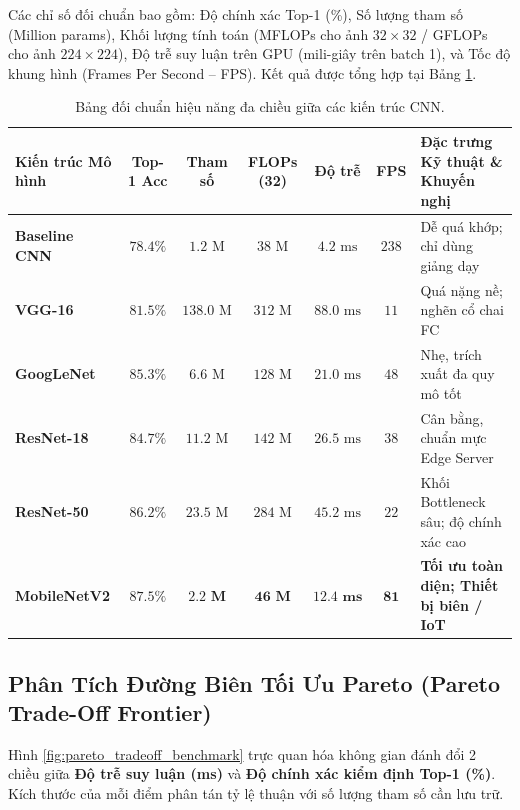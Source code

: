 \documentclass[12pt,a4paper]{report}
\begin{document}
Các chỉ số đối chuẩn bao gồm: Độ chính xác Top-1 (\%), Số lượng tham số (Million params), Khối lượng tính toán (MFLOPs cho ảnh $32\times 32$ / GFLOPs cho ảnh $224\times 224$), Độ trễ suy luận trên GPU (mili-giây trên batch 1), và Tốc độ khung hình (Frames Per Second -- FPS). Kết quả được tổng hợp tại Bảng \ref{tab:multi_model_benchmark}.

\begin{table}[H]
\centering
\caption{Bảng đối chuẩn hiệu năng đa chiều giữa các kiến trúc CNN.}
\label{tab:multi_model_benchmark}
\small
\begin{tabularx}{\textwidth}{lcccccX}
\toprule
\textbf{Kiến trúc Mô hình} & \textbf{Top-1 Acc} & \textbf{Tham số} & \textbf{FLOPs (32)} & \textbf{Độ trễ} & \textbf{FPS} & \textbf{Đặc trưng Kỹ thuật \& Khuyến nghị} \\
\midrule
\textbf{Baseline CNN}   & $78.4\%$ & $1.2\text{ M}$ & $38\text{ M}$ & $4.2\text{ ms}$ & $238$ & Dễ quá khớp; chỉ dùng giảng dạy \\
\textbf{VGG-16}         & $81.5\%$ & $138.0\text{ M}$ & $312\text{ M}$ & $88.0\text{ ms}$ & $11$ & Quá nặng nề; nghẽn cổ chai FC \\
\textbf{GoogLeNet}      & $85.3\%$ & $6.6\text{ M}$ & $128\text{ M}$ & $21.0\text{ ms}$ & $48$ & Nhẹ, trích xuất đa quy mô tốt \\
\textbf{ResNet-18}      & $84.7\%$ & $11.2\text{ M}$ & $142\text{ M}$ & $26.5\text{ ms}$ & $38$ & Cân bằng, chuẩn mực Edge Server \\
\textbf{ResNet-50}      & $86.2\%$ & $23.5\text{ M}$ & $284\text{ M}$ & $45.2\text{ ms}$ & $22$ & Khối Bottleneck sâu; độ chính xác cao \\
\textbf{MobileNetV2}    & $\mathbf{87.5\%}$ & $\mathbf{2.2\text{ M}}$ & $\mathbf{46\text{ M}}$ & $\mathbf{12.4\text{ ms}}$ & $\mathbf{81}$ & \textbf{Tối ưu toàn diện; Thiết bị biên / IoT} \\
\bottomrule
\end{tabularx}
\end{table}

\subsection{Phân Tích Đường Biên Tối Ưu Pareto (Pareto Trade-Off Frontier)}
Hình \ref{fig:pareto_tradeoff_benchmark} trực quan hóa không gian đánh đổi 2 chiều giữa \textbf{Độ trễ suy luận (ms)} và \textbf{Độ chính xác kiểm định Top-1 (\%)}. Kích thước của mỗi điểm phân tán tỷ lệ thuận với số lượng tham số cần lưu trữ.
\end{document}

